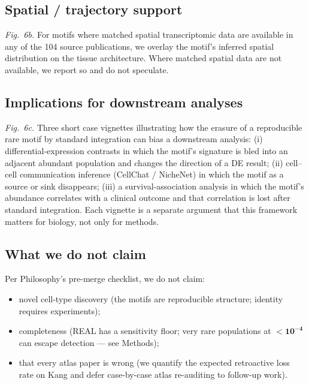 \subsection{Spatial / trajectory support}

\emph{Fig.~6b.}  For motifs where matched spatial transcriptomic data are available in any of the 104 source publications, we overlay the motif's inferred spatial distribution on the tissue architecture.  Where matched spatial data are not available, we report so and do not speculate.

\subsection{Implications for downstream analyses}

\emph{Fig.~6c.}  Three short case vignettes illustrating how the erasure of a reproducible rare motif by standard integration can bias a downstream analysis: (i) differential-expression contrasts in which the motif's signature is bled into an adjacent abundant population and changes the direction of a DE result; (ii) cell--cell communication inference (CellChat / NicheNet) in which the motif as a source or sink disappears; (iii) a survival-association analysis in which the motif's abundance correlates with a clinical outcome and that correlation is lost after standard integration.  Each vignette is a separate argument that this framework matters for biology, not only for methods.



\subsection{What we do not claim}

Per Philosophy's pre-merge checklist, we do not claim:
\begin{itemize}
\item novel cell-type discovery (the motifs are reproducible structure; identity requires experiments);
\item completeness (REAL has a sensitivity floor; very rare populations at $\mathbf{<10^{-4}}$ can escape detection --- see Methods);
\item that every atlas paper is wrong (we quantify the expected retroactive loss rate on Kang and defer case-by-case atlas re-auditing to follow-up work).
\end{itemize}
